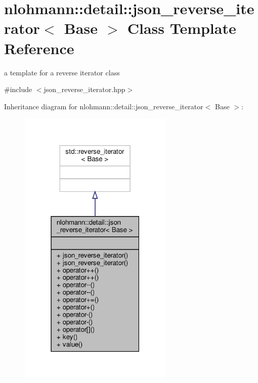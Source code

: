 \hypertarget{classnlohmann_1_1detail_1_1json__reverse__iterator}{}\section{nlohmann\+:\+:detail\+:\+:json\+\_\+reverse\+\_\+iterator$<$ Base $>$ Class Template Reference}
\label{classnlohmann_1_1detail_1_1json__reverse__iterator}


a template for a reverse iterator class  




{\ttfamily \#include $<$json\+\_\+reverse\+\_\+iterator.\+hpp$>$}



Inheritance diagram for nlohmann\+:\+:detail\+:\+:json\+\_\+reverse\+\_\+iterator$<$ Base $>$\+:\nopagebreak
\begin{figure}[H]
\begin{center}
\leavevmode
\includegraphics[width=210pt]{classnlohmann_1_1detail_1_1json__reverse__iterator__inherit__graph}
\end{center}
\end{figure}


